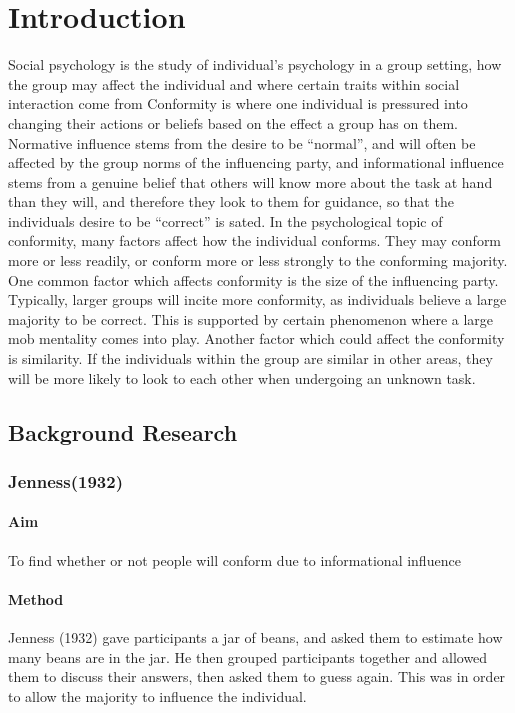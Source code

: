 \documentclass{report}
\begin{document}
\maketitle
\tableofcontents
\chapter{Introduction}
Social psychology is the study of individual’s psychology in a group setting,  how the group may affect the individual and where certain traits within social interaction come from Conformity is where one individual is pressured into changing their actions or beliefs based on the effect a group has on them. Normative influence stems from the desire to be “normal”, and will often be affected by the group norms of the influencing party, and informational influence stems from a genuine belief that others will know more about the task at hand than they will, and therefore they look to them for guidance, so that the individuals desire to be “correct” is sated. In the psychological topic of conformity, many factors affect how the individual conforms. They may conform more or less readily, or conform more or less strongly to the conforming majority. One common factor which affects conformity is the size of the influencing party. Typically, larger groups will incite more conformity, as individuals believe a large majority to be correct. This is supported by certain phenomenon where a large mob mentality comes into play. Another factor which could affect the conformity is similarity. If the individuals within the group are similar in other areas, they will be more likely to look to each other when undergoing an unknown task.

\section{Background Research}

\subsection{Jenness(1932)}
\subsubsection{Aim}
To find whether or not people will conform due to informational influence
\subsubsection{Method}
Jenness (1932) gave participants a jar of beans, and asked them to estimate how many beans are in the jar. He then grouped participants together and allowed them to discuss their answers, then asked them to guess again. This was in order to allow the majority to influence the individual.
\end{document}
